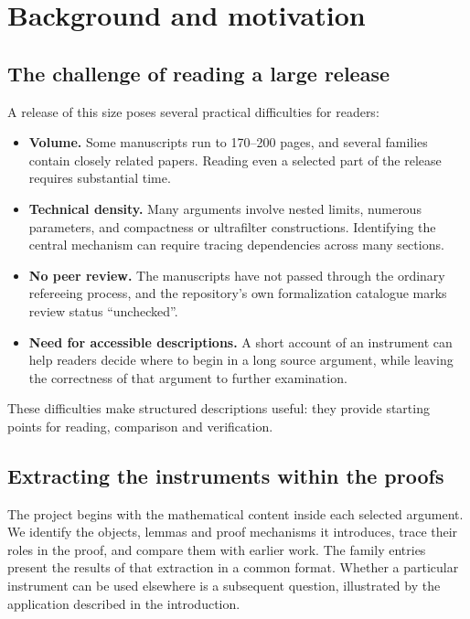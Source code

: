 \documentclass[11pt]{article}
\begin{document}
\section{Background and motivation}\label{sec:background}

\subsection{The challenge of reading a large release}
A release of this size poses several practical difficulties for readers:
\begin{itemize}
\item \textbf{Volume.} Some manuscripts run to 170--200 pages, and several families contain closely related papers. Reading even a selected part of the release requires substantial time.
\item \textbf{Technical density.} Many arguments involve nested limits, numerous parameters, and compactness or ultrafilter constructions. Identifying the central mechanism can require tracing dependencies across many sections.
\item \textbf{No peer review.} The manuscripts have not passed through the ordinary refereeing process, and the repository's own formalization catalogue marks review status ``unchecked''.
\item \textbf{Need for accessible descriptions.} A short account of an instrument can help readers decide where to begin in a long source argument, while leaving the correctness of that argument to further examination.
\end{itemize}
These difficulties make structured descriptions useful: they provide starting points for reading, comparison and verification.

\subsection{Extracting the instruments within the proofs}
The project begins with the mathematical content inside each selected argument. We identify the objects, lemmas and proof mechanisms it introduces, trace their roles in the proof, and compare them with earlier work. The family entries present the results of that extraction in a common format. Whether a particular instrument can be used elsewhere is a subsequent question, illustrated by the application described in the introduction.
\end{document}
